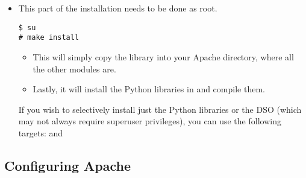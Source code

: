 \begin{itemize}

\item
This part of the installation needs to be done as root. 
\begin{verbatim}
$ su
# make install
\end{verbatim}
                      
\begin{itemize}

\item
This will simply copy the library into your Apache 
directory, where all the other modules are.


\item
Lastly, it will install the Python libraries in  and
compile them. 

\end{itemize} 

 If you wish to selectively install just the Python libraries
or the DSO (which may not always require superuser
privileges), you can use the following  targets:
 and 

\end{itemize}

\subsection{Configuring Apache\label{inst-apacheconfig}}

